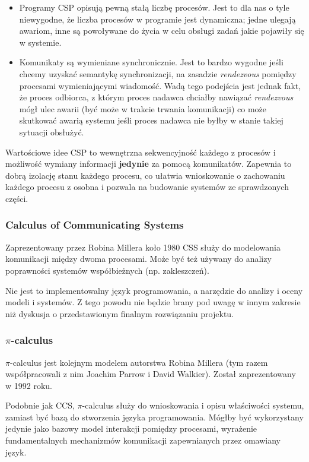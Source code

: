 \documentclass[11pt,oneside,a4paper,titlepage,onecolumn]{article}
\begin{document}
\begin{itemize}
\item Programy CSP opisują pewną stałą liczbę procesów. Jest to dla nas o tyle niewygodne, że liczba
    procesów w programie jest dynamiczna; jedne ulegają awariom, inne są powoływane do życia w celu
    obsługi zadań jakie pojawiły się w systemie.
\item Komunikaty są wymieniane synchronicznie. Jest to bardzo wygodne jeśli chcemy uzyskać semantykę
    synchronizacji, na zasadzie \emph{rendezvous} pomiędzy procesami wymieniającymi wiadomość.
    Wadą tego podejścia jest jednak fakt, że proces odbiorca, z którym proces nadawca chciałby nawiązać
    \emph{rendezvous} mógł ulec awarii (być może w trakcie trwania komunikacji) co może skutkować
    awarią systemu jeśli proces nadawca nie byłby w stanie takiej sytuacji obsłużyć.
\end{itemize}

Wartościowe idee CSP to wewnętrzna sekwencyjność każdego z procesów i możliwość wymiany informacji
\textbf{jedynie} za pomocą komunikatów. Zapewnia to dobrą izolację stanu każdego procesu, co ułatwia
wnioskowanie o zachowaniu każdego procesu z osobna i pozwala na budowanie systemów ze sprawdzonych
części.

\subsubsection{Calculus of Communicating Systems}

Zaprezentowany przez Robina Millera koło 1980 CSS służy do modelowania komunikacji między dwoma
procesami. Może być też używany do analizy poprawności systemów współbieżnych (np. zakleszczeń).

Nie jest to implementowalny język programowania, a narzędzie do analizy i oceny modeli i systemów.
Z tego powodu nie będzie brany pod uwagę w innym zakresie niż dyskusja o przedstawionym finalnym
rozwiązaniu projektu.

\subsubsection{$\pi$-calculus}

$\pi$-calculus jest kolejnym modelem autorstwa Robina Millera (tym razem współpracowali z nim
Joachim Parrow i David Walkier). Został zaprezentowany w 1992 roku.

Podobnie jak CCS, $\pi$-calculus służy do wnioskowania i opisu właściwości systemu, zamiast być
bazą do stworzenia języka programowania. Mógłby być wykorzystany jedynie jako bazowy model interakcji
pomiędzy procesami, wyrażenie fundamentalnych mechanizmów komunikacji zapewnianych przez omawiany
język.
\end{document}
